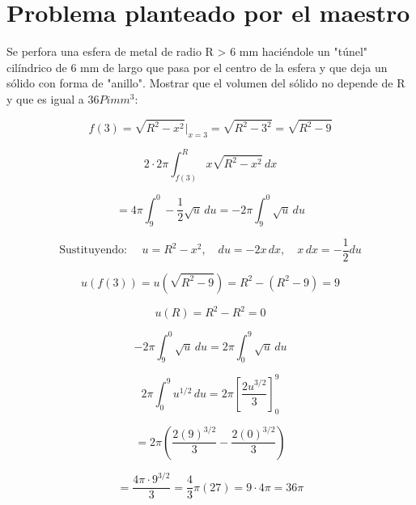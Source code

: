 \chapter*{Problema planteado por el maestro}


Se perfora una esfera de metal de radio R > 6 mm haciéndole un "túnel" cilíndrico de 6 mm de largo que pasa por el centro de la esfera y que deja un sólido con forma de "anillo".
Mostrar que el volumen del sólido no depende de R y que es igual a $36Pi mm^3$:

\[
f(3) = \sqrt{R^2 - x^2} \Big|_{x=3} = \sqrt{R^2 - 3^2} = \sqrt{R^2 - 9}
\]

\[
2 \cdot 2\pi \int_{f(3)}^{R} x \sqrt{R^2 - x^2} \, dx
\]

\[
= 4\pi \int_{9}^{0} -\frac{1}{2} \sqrt{u} \, du = -2\pi \int_{9}^{0} \sqrt{u} \, du
\]

\[
\text{Sustituyendo: } 
\quad u = R^2 - x^2, \quad du = -2x \, dx, \quad x \, dx = -\frac{1}{2} du
\]

\[
u(f(3)) = u(\sqrt{R^2 - 9}) = R^2 - (R^2 - 9) = 9
\]

\[
u(R) = R^2 - R^2 = 0
\]

\[
-2\pi \int_{9}^{0} \sqrt{u} \, du = 2\pi \int_{0}^{9} \sqrt{u} \, du
\]

\[
2\pi \int_{0}^{9} u^{1/2} \, du = 2\pi \left[ \frac{2u^{3/2}}{3} \right]_0^9
\]

\[
= 2\pi \left( \frac{2(9)^{3/2}}{3} - \frac{2(0)^{3/2}}{3} \right)
\]

\[
= \frac{4\pi \cdot 9^{3/2}}{3} = \frac{4}{3}\pi (27) = 9 \cdot 4\pi = 36\pi
\]